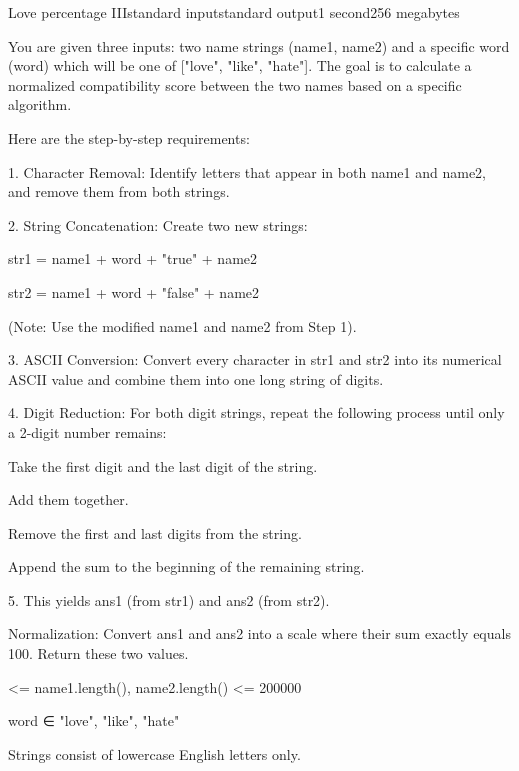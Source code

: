 \begin{problem}{Love percentage III}{standard input}{standard output}{1 second}{256 megabytes}

You are given three inputs: two name strings (name1, name2) and a specific word (word) which will be one of ["love", "like", "hate"]. The goal is to calculate a normalized compatibility score between the two names based on a specific algorithm.

Here are the step-by-step requirements:

1. Character Removal: Identify letters that appear in both name1 and name2, and remove them from both strings.

2. String Concatenation: Create two new strings:

    str1 = name1 + word + "true" + name2

    str2 = name1 + word + "false" + name2

   (Note: Use the modified name1 and name2 from Step 1).

3. ASCII Conversion: Convert every character in str1 and str2 into its numerical ASCII value and combine them into one long string of digits.

4. Digit Reduction: For both digit strings, repeat the following process until only a 2-digit number remains:

    Take the first digit and the last digit of the string.

    Add them together.

    Remove the first and last digits from the string.

    Append the sum to the beginning of the remaining string.

5. This yields ans1 (from str1) and ans2 (from str2).

Normalization: Convert ans1 and ans2 into a scale where their sum exactly equals 100. Return these two values.


 <= name1.length(), name2.length() <= 200000

word ∈ {"love", "like", "hate"}

Strings consist of lowercase English letters only.

\end{problem}

